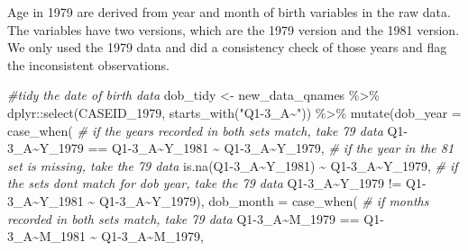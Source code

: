 \documentclass[12pt]{article}
\newenvironment{Shaded}{\begin{snugshade}}{\end{snugshade}}
\newcommand{\AttributeTok}[1]{\textcolor[rgb]{0.77,0.63,0.00}{#1}}
\newcommand{\CommentTok}[1]{\textcolor[rgb]{0.56,0.35,0.01}{\textit{#1}}}
\newcommand{\FunctionTok}[1]{\textcolor[rgb]{0.00,0.00,0.00}{#1}}
\newcommand{\NormalTok}[1]{#1}
\newcommand{\OtherTok}[1]{\textcolor[rgb]{0.56,0.35,0.01}{#1}}
\newcommand{\SpecialCharTok}[1]{\textcolor[rgb]{0.00,0.00,0.00}{#1}}
\newcommand{\StringTok}[1]{\textcolor[rgb]{0.31,0.60,0.02}{#1}}
\begin{document}
Age in 1979 are derived from year and month of birth variables in the raw data. The variables have two versions, which are the 1979 version and the 1981 version. We only used the 1979 data and did a consistency check of those years and flag the inconsistent observations.

\begin{Shaded}
\begin{Highlighting}[]
\CommentTok{\#tidy the date of birth data}
\NormalTok{dob\_tidy }\OtherTok{\textless{}{-}}\NormalTok{ new\_data\_qnames }\SpecialCharTok{\%\textgreater{}\%}
\NormalTok{  dplyr}\SpecialCharTok{::}\FunctionTok{select}\NormalTok{(CASEID\_1979,}
                \FunctionTok{starts\_with}\NormalTok{(}\StringTok{"Q1{-}3\_A\textasciitilde{}"}\NormalTok{)) }\SpecialCharTok{\%\textgreater{}\%}
  \FunctionTok{mutate}\NormalTok{(}\AttributeTok{dob\_year =} \FunctionTok{case\_when}\NormalTok{(}
    \CommentTok{\# if the years recorded in both sets match, take 79 data}
    \StringTok{\textasciigrave{}}\AttributeTok{Q1{-}3\_A\textasciitilde{}Y\_1979}\StringTok{\textasciigrave{}} \SpecialCharTok{==} \StringTok{\textasciigrave{}}\AttributeTok{Q1{-}3\_A\textasciitilde{}Y\_1981}\StringTok{\textasciigrave{}} \SpecialCharTok{\textasciitilde{}} \StringTok{\textasciigrave{}}\AttributeTok{Q1{-}3\_A\textasciitilde{}Y\_1979}\StringTok{\textasciigrave{}}\NormalTok{,}
    \CommentTok{\# if the year in the 81 set is missing, take the 79 data}
    \FunctionTok{is.na}\NormalTok{(}\StringTok{\textasciigrave{}}\AttributeTok{Q1{-}3\_A\textasciitilde{}Y\_1981}\StringTok{\textasciigrave{}}\NormalTok{) }\SpecialCharTok{\textasciitilde{}} \StringTok{\textasciigrave{}}\AttributeTok{Q1{-}3\_A\textasciitilde{}Y\_1979}\StringTok{\textasciigrave{}}\NormalTok{,}
    \CommentTok{\# if the sets don\textquotesingle{}t match for dob year, take the 79 data}
    \StringTok{\textasciigrave{}}\AttributeTok{Q1{-}3\_A\textasciitilde{}Y\_1979}\StringTok{\textasciigrave{}} \SpecialCharTok{!=} \StringTok{\textasciigrave{}}\AttributeTok{Q1{-}3\_A\textasciitilde{}Y\_1981}\StringTok{\textasciigrave{}} \SpecialCharTok{\textasciitilde{}} \StringTok{\textasciigrave{}}\AttributeTok{Q1{-}3\_A\textasciitilde{}Y\_1979}\StringTok{\textasciigrave{}}\NormalTok{),}
    \AttributeTok{dob\_month =} \FunctionTok{case\_when}\NormalTok{(}
      \CommentTok{\# if months recorded in both sets match, take 79 data}
      \StringTok{\textasciigrave{}}\AttributeTok{Q1{-}3\_A\textasciitilde{}M\_1979}\StringTok{\textasciigrave{}} \SpecialCharTok{==} \StringTok{\textasciigrave{}}\AttributeTok{Q1{-}3\_A\textasciitilde{}M\_1981}\StringTok{\textasciigrave{}} \SpecialCharTok{\textasciitilde{}} \StringTok{\textasciigrave{}}\AttributeTok{Q1{-}3\_A\textasciitilde{}M\_1979}\StringTok{\textasciigrave{}}\NormalTok{,}

\end{Highlighting}
\end{Shaded}
\end{document}
